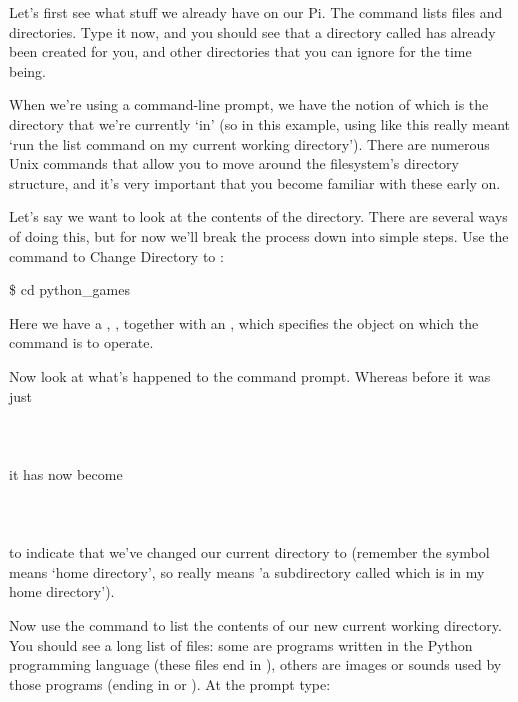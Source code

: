 Let's first see what stuff we already have on our Pi. The  command lists files and directories. Type it now, and you should see that a directory called  has already been created for you, and other directories that you can ignore for the time being.



When we're using a command-line prompt, we have the notion of  which is the directory that we're currently `in' (so in this example, using  like this really meant `run the list command on my current working directory'). There are numerous Unix commands that allow you to move around the filesystem's directory structure, and it's very important that you become familiar with these early on.

Let's say we want to look at the contents of the  directory. There are several ways of doing this, but for now we'll break the process down into simple steps. Use the  command to Change Directory to :

\begin{ttoutenv}
\$ cd python_games
\end{ttoutenv}

Here we have a , , together with an ,  which specifies the object on which the command is to operate.

Now look at what's happened to the command prompt. Whereas before it was just
\\
\\
\\
\\
it has now become
\\
\\
\\
\\
to indicate that we've changed our current directory to  (remember the \texttildelow{} symbol means `home directory', so  really means 'a subdirectory called  which is in my home directory').

Now use the  command to list the contents of our new current working directory. You should see a long list of files: some are programs written in the Python programming language (these files end in ), others are images or sounds used by those programs (ending in  or ). At the prompt type:

